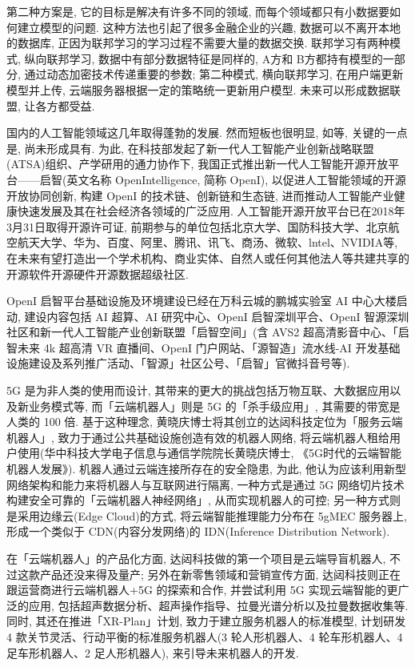 第二种方案是, 它的目标是解决有许多不同的领域, 而每个领域都只有小数据要如何建立模型的问题. 这种方法也引起了很多金融企业的兴趣, 数据可以不离开本地的数据库, 正因为联邦学习的学习过程不需要大量的数据交换. 联邦学习有两种模式, 纵向联邦学习, 数据中有部分数据特征是同样的, A方和 B方都持有模型的一部分, 通过动态加密技术传递重要的参数; 第二种模式, 横向联邦学习, 在用户端更新模型并上传, 云端服务器根据一定的策略统一更新用户模型. 未来可以形成数据联盟, 让各方都受益.

国内的人工智能领域这几年取得蓬勃的发展. 然而短板也很明显, 如等, 关键的一点是, 尚未形成具有.
为此, 在科技部发起了新一代人工智能产业创新战略联盟(ATSA)组织、产学研用的通力协作下, 我国正式推出新一代人工智能开源开放平台——启智(英文名称 OpenIntelligence, 简称 OpenI), 以促进人工智能领域的开源开放协同创新, 构建 OpenI 的技术链、创新链和生态链, 进而推动人工智能产业健康快速发展及其在社会经济各领域的广泛应用.
人工智能开源开放平台已在2018年3月31日取得开源许可证, 前期参与的单位包括北京大学、国防科技大学、北京航空航天大学、华为、百度、阿里、腾讯、讯飞、商汤、微软、lntel、NVIDIA等, 在未来有望打造出一个学术机构、商业实体、自然人或任何其他法人等共建共享的开源软件开源硬件开源数据超级社区.

OpenI 启智平台基础设施及环境建设已经在万科云城的鹏城实验室 AI 中心大楼启动, 建设内容包括 AI 超算、AI 研究中心、OpenI 启智深圳平合、OpenI 智源深圳社区和新一代人工智能产业创新联盟「启智空间」(含 AVS2 超高清影音中心、「启智未来 4k 超高清 VR 直播间、OpenI 门户网站、「源智造」流水线-AI 开发基础设施建设及系列推广活动、「智源」社区公号、「启智」官微抖音号等).

5G 是为非人类的使用而设计, 其带来的更大的挑战包括万物互联、大数据应用以及新业务模式等, 而「云端机器人」则是 5G 的「杀手级应用」, 其需要的带宽是人类的 100 倍. 基于这种理念, 黄晓庆博士将其创立的达闼科技定位为「服务云端机器人」, 致力于通过公共基础设施创造有效的机器人网络, 将云端机器人租给用户使用(华中科技大学电子信息与通信学院院长黄晓庆博士, 《5G时代的云端智能机器人发展》).
机器人通过云端连接所存在的安全隐患, 为此, 他认为应该利用新型网络架构和能力来将机器人与互联网进行隔离, 一种方式是通过 5G 网络切片技术构建安全可靠的「云端机器人神经网络」, 从而实现机器人的可控; 另一种方式则是采用边缘云(Edge Cloud)的方式, 将云端智能推理能力分布在 5gMEC 服务器上, 形成一个类似于 CDN(内容分发网络)的 IDN(Inference Distribution Network).

在「云端机器人」的产品化方面, 达闼科技做的第一个项目是云端导盲机器人, 不过这款产品还没来得及量产; 另外在新零售领域和营销宣传方面, 达闼科技则正在跟运营商进行云端机器人+5G 的探索和合作, 并尝试利用 5G 实现云端智能的更广泛的应用, 包括超声数据分析、超声操作指导、拉曼光谱分析以及拉曼数据收集等. 同时, 其还在推进「XR-Plan」计划, 致力于建立服务机器人的标准模型, 计划研发 4 款关节灵活、行动平衡的标准服务机器人(3 轮人形机器人、4 轮车形机器人、4 足车形机器人、2 足人形机器人), 来引导未来机器人的开发.

